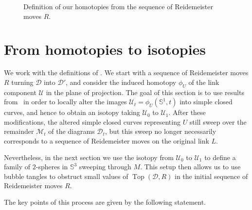 \documentclass[10pt,a4paper]{amsart}
\newcommand{\R}{\mathbb{R}}
\newcommand{\Sp}{\mathbb{S}}
\newcommand\tikzmark[5][0]{\tikz[overlay,remember picture,baseline] \node [rotate=#1,anchor=base,xshift=#4,yshift=#5] (#2) {$\scriptstyle#3$};}
\newcommand{\addcross}{\operatorname{Top}}
\begin{document}
\begin{figure}[ht]
\begin{center}
\caption{Definition of our homotopies from the sequence of Reidemeister moves $R$.}
\label{pic_commut_op_def}
\end{center}
\end{figure}


\section{From homotopies to isotopies}\label{sec_homo_iso}

We work with the definitions of . We start with a sequence of Reidemeister moves $R$ turning $\mathcal{D}$ into $\mathcal{D}'$, and consider the induced homotopy $\phi_U$ of the link component $\mathcal{U}$ in the plane of projection. The goal of this section is to use results from~\cite{Chambers_homo-isotopy} in order to locally alter the images $\mathcal{U}_t=\phi_U(\Sp^1,t)$ into simple closed curves, and hence to obtain an isotopy taking $\mathcal{U}_0$ to $\mathcal{U}_1$. 
After these modifications, the altered simple closed curves representing $U$ still sweep over the remainder $\mathcal{M}_t$ of the diagrams $\mathcal{D}_t$, but this sweep no longer necessarily corresponds to a sequence of Reidemeister moves on the original link $L$.

Nevertheless, in the next section we use the isotopy from $\mathcal{U}_0$ to $\mathcal{U}_1$ to define a family of $2$-spheres in $\Sp^3$ sweeping through $M$. This setup then allows us to use bubble tangles to obstruct small values of $\addcross(\mathcal{D},R)$ in the initial sequence of Reidemeister moves $R$.

\medskip

The key points of this process are given by the following statement.
\end{document}
